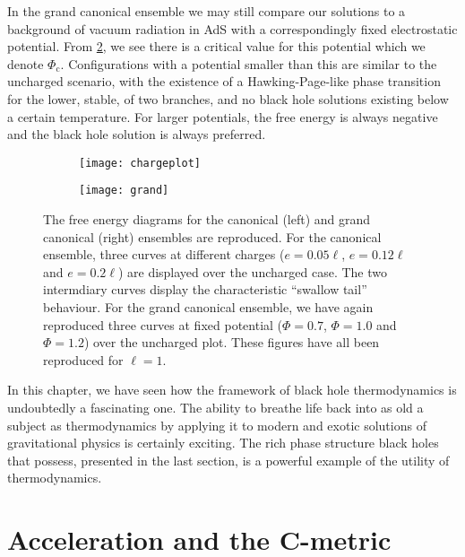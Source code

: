 \documentclass[
twoside,
openright,
frontopenright,
]{dmathesis}
\begin{document}
In the grand canonical ensemble we may still compare our solutions to a
background of vacuum radiation in AdS with a correspondingly fixed electrostatic
potential. From \cref{fig:grand}, we see there is a critical value for this
potential which we denote $\Phi_\mathrm{c}$. Configurations with a potential
smaller than this are similar to the uncharged scenario, with the existence of a
Hawking-Page-like phase transition for the lower, stable, of two branches, and
no black hole solutions existing below a certain temperature. For larger
potentials, the free energy is always negative and the black hole solution is
always preferred.

\begin{figure}
  \centering
  \begin{subfigure}[b]{0.45\textwidth}
    \texttt{[image: chargeplot]}
    \caption{\label{fig:charge-fe}}
  \end{subfigure}\qquad
  \begin{subfigure}[b]{0.45\textwidth}
    \texttt{[image: grand]}
    \caption{\label{fig:grand}}
  \end{subfigure}
  \caption{\label{fig:chargeplots}The free energy diagrams for the canonical
    (left) and grand canonical (right) ensembles are reproduced. For the
    canonical ensemble, three curves at different charges ($e = 0.05\ell$,
    $e=0.12\ell$ and $e = 0.2\ell$) are displayed over the uncharged case. The
    two intermdiary curves display the characteristic ``swallow tail''
    behaviour. For the grand canonical ensemble, we have again reproduced three
    curves at fixed potential ($\Phi = 0.7$, $\Phi = 1.0$ and $\Phi = 1.2$) over the
    uncharged plot. These figures have all been reproduced for $\ell = 1$.}
\end{figure}

In this chapter, we have seen how the framework of black hole thermodynamics is
undoubtedly a fascinating one. The ability to breathe life back into as old a
subject as thermodynamics by applying it to modern and exotic solutions of
gravitational physics is certainly exciting. The rich phase structure black
holes that possess, presented in the last section, is a powerful example of the
utility of thermodynamics.
 
\chapter{Acceleration and the C-metric}
\label{chap:cmet}
\end{document}

